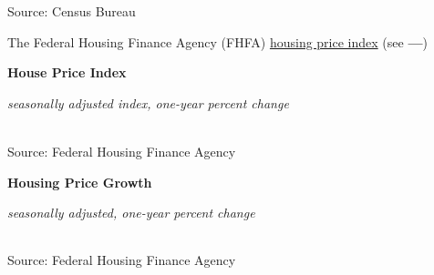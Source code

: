 \documentclass{report}
\makeatletter
\newcommand{\tbllink}[1]{\href{https://raw.githubusercontent.com/bdecon/US-chartbook/master/chartbook/data/#1}{\faTable}}
\newcommand*\short[1]{\expandafter\@gobbletwo\number\numexpr#1\relax}
\newcommand{\dateaxisticks}{
		date coordinates in=x, axis line style={draw=none},
		xmax={2020-08-10},
		max space between ticks=40,	    
		xtick={{1990-01-01}, {1992-01-01}, {1994-01-01}, 
			{1996-01-01}, {1998-01-01}, {2000-01-01}, 
			{2002-01-01}, {2004-01-01}, {2006-01-01},
			{2008-01-01}, {2010-01-01}, {2012-01-01}, {2014-01-01},
		    {2016-01-01}, {2018-01-01}, {2020-01-01}},
		minor xtick={{1989-01-01}, {1991-01-01}, {1993-01-01},
			{1995-01-01}, {1997-01-01}, {1999-01-01}, 
			{2001-01-01}, {2003-01-01}, {2005-01-01}, {2007-01-01},
		    {2009-01-01}, {2011-01-01}, {2013-01-01}, {2015-01-01},
		    {2017-01-01}, {2019-01-01}},
		enlarge y limits={0.06}, enlarge x limits={0.01},
		}
\newcommand{\bbar}[2]{extra #1 ticks = {{#2}}, extra #1 tick labels = ,
		extra #1 tick style = {grid=major, grid style={thick, black!25}},}
\newcommand{\thickline}[4]{\addplot[ultra thick, no markers, color=#1] 
		table [x=#2, y=#3, col sep=comma] {#4};	}
\newcommand{\rebars}{
		\fill[color=black!10] (axis cs:{2007-12-01},\pgfkeysvalueof{/pgfplots/ymin}) rectangle 
			(axis cs:{2009-07-01}, \pgfkeysvalueof{/pgfplots/ymax});
		\fill[color=black!10] (axis cs:{2001-03-01},\pgfkeysvalueof{/pgfplots/ymin}) rectangle 
			(axis cs:{2001-11-01}, \pgfkeysvalueof{/pgfplots/ymax});
		\fill[color=black!10] (axis cs:{2020-02-01},\pgfkeysvalueof{/pgfplots/ymin}) rectangle 
			(axis cs:{2020-09-01}, \pgfkeysvalueof{/pgfplots/ymax});}
\makeatother
\begin{document}
{{{\begin{minipage}{0.76\textwidth}
\footnotesize{Source: Census Bureau} \hfill \tbllink{permits.csv}

\end{minipage}

\newpage

\begin{minipage}{0.76\textwidth}

\small The Federal Housing Finance Agency (FHFA) \href{https://www.fhfa.gov/DataTools/Downloads/Pages/House-Price-Index-Datasets.aspx}{housing price index} (see {\color{blue!40!cyan}\textbf{---}}) 

\vspace{3mm}

\normalsize \textbf{House Price Index}

\footnotesize{\textit{seasonally adjusted index, one-year percent change}}

\hspace*{-2mm} \\
\footnotesize{Source: Federal Housing Finance Agency} \hfill \tbllink{hpi.csv}

\vspace{4mm}

\normalsize{\textbf{Housing Price Growth}}

\footnotesize{\textit{seasonally adjusted, one-year percent change}}

\hspace*{-3mm} \noindent {} \setlength{\tabcolsep}{3.1pt} \color{black!90}
		{\renewcommand{\arraystretch}{1.5}
		 \begin{tabular}{p{24mm} R{7.1mm} R{7.1mm} R{7.1mm} R{7.1mm} R{7.1mm} R{7.1mm} R{7.1mm} R{12.0mm} R{10.8mm}}
			 \hline
		\end{tabular}}
		
\vspace{1mm}
		
\footnotesize{Source: Federal Housing Finance Agency} \hfill \tbllink{hpi.csv}

\vspace{7mm}


\end{minipage}}}}
\end{document}
